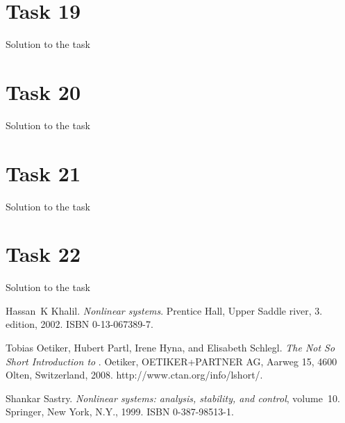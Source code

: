 \documentclass[a4paper,12pt,oneside,onecolumn]{article} %
\begin{document}
\section*{Task 19}

Solution to the task

\section*{Task 20}

Solution to the task

\section*{Task 21}

Solution to the task

\section*{Task 22}

Solution to the task




\begin{thebibliography}{99}
Hassan~K Khalil.
\newblock \emph{Nonlinear systems}.
\newblock Prentice Hall, Upper Saddle river, 3. edition, 2002.
\newblock ISBN 0-13-067389-7.

Tobias Oetiker, Hubert Partl, Irene Hyna, and Elisabeth Schlegl.
\newblock \emph{The Not So Short Introduction to \LaTeXe}.
\newblock Oetiker, OETIKER+PARTNER AG, Aarweg 15, 4600 Olten, Switzerland,
  2008.
\newblock http://www.ctan.org/info/lshort/.

Shankar Sastry.
\newblock \emph{Nonlinear systems: analysis, stability, and control},
  volume~10.
\newblock Springer, New York, N.Y., 1999.
\newblock ISBN 0-387-98513-1.
\end{thebibliography}
\end{document}
